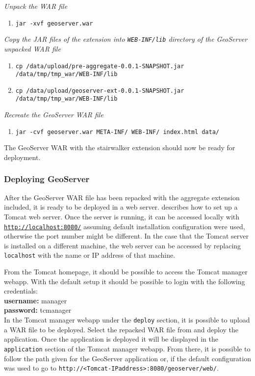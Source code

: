 \noindent \textit{Unpack the WAR file}
\begin{enumerate}
	\item \lstinline|jar -xvf geoserver.war|
\end{enumerate}
\textit{Copy the JAR files of the extension into \lstinline|WEB-INF/lib| directory of the GeoServer unpacked WAR file}
\begin{enumerate}
	\item \lstinline|cp /data/upload/pre-aggregate-0.0.1-SNAPSHOT.jar /data/tmp/tmp_war/WEB-INF/lib|
	\item \lstinline|cp /data/upload/geoserver-ext-0.0.1-SNAPSHOT.jar /data/tmp/tmp_war/WEB-INF/lib|
\end{enumerate}
\textit{Recreate the GeoServer WAR file}
\begin{enumerate}
	\item \lstinline|jar -cvf geoserver.war META-INF/ WEB-INF/ index.html data/|
\end{enumerate}
The GeoServer WAR with the stairwalker extension should now be ready for
deployment.

\subsubsection{Deploying GeoServer}
\label{sec:geotomcat}

After the GeoServer WAR file has been repacked with the aggregate extension
included, it is ready to be deployed in a web server. 
describes how to set up a Tomcat web server. Once the server is
running, it can be accessed locally with
\href{http://localhost:8080/}{\lstinline|http://localhost:8080/|} assuming
default installation configuration were used, otherwise the port number
might be different. In the case that the Tomcat server is installed on a
different machine, the web server can be accessed by replacing
\lstinline|localhost| with the name or IP address of that machine.

From the Tomcat homepage, it should be possible to access the Tomcat manager
webapp. With the default setup it should be possible to login with the
following credentials:\\
\indent \textbf{username:} manager \\
\indent \textbf{password:} tcmanager \\

In the Tomcat manager webapp under the \lstinline|deploy| section, it is
possible to upload a WAR file to be deployed. Select the repacked WAR file
from  and deploy the application. Once the
application is deployed it will be displayed in the \lstinline|application|
section of the Tomcat manager webapp. From there, it is possible to follow
the path given for the GeoServer application or, if the default
configuration was used to go to
\mbox{\lstinline|http://<Tomcat-IPaddress>:8080/geoserver/web/|}.
